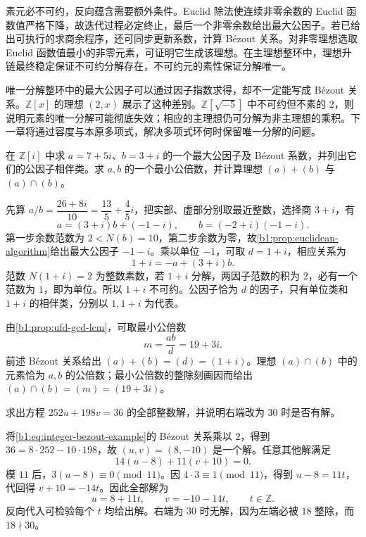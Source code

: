




\begin{chaptersummary}
	素元必不可约，反向蕴含需要额外条件。Euclid 除法使连续非零余数的 Euclid 函数值严格下降，故迭代过程必定终止，最后一个非零余数给出最大公因子。若已给出可执行的求商余程序，还可同步更新系数，计算 Bézout 关系。对非零理想选取 Euclid 函数值最小的非零元素，可证明它生成该理想。在主理想整环中，理想升链最终稳定保证不可约分解存在，不可约元的素性保证分解唯一。

	\ProseParagraphBreak
	唯一分解整环中的最大公因子可以通过因子指数求得，却不一定能写成 Bézout 关系。\(\mathbb Z[x]\) 的理想 \((2,x)\) 展示了这种差别。\(\mathbb Z[\sqrt{-5}]\) 中不可约但不素的 \(2\)，则说明元素的唯一分解可能彻底失效；相应的主理想仍可分解为非主理想的乘积。下一章将通过容度与本原多项式，解决多项式环何时保留唯一分解的问题。
\end{chaptersummary}

\BookExercises

\begin{exercise}\label{b1:ex:11-gaussian-gcd}
	在 \(\mathbb Z[i]\) 中求 \(a=7+5i\)、\(b=3+i\) 的一个最大公因子及 Bézout 系数，并列出它们的公因子相伴类。求 \(a,b\) 的一个最小公倍数，并计算理想 \((a)+(b)\) 与 \((a)\cap(b)\)。
\end{exercise}
\begin{solution}
	先算 \(a/b=\dfrac{26+8i}{10}=\dfrac{13}{5}+\dfrac45i\)，把实部、虚部分别取最近整数，选择商 \(3+i\)，有
	\[
		a=(3+i)b+(-1-i),\qquad b=(-2+i)(-1-i).
	\]
	第一步余数范数为 \(2<N(b)=10\)，第二步余数为零，故\cref{b1:prop:euclidean-algorithm}给出最大公因子 \(-1-i\)。乘以单位 \(-1\)，可取 \(d=1+i\)，相应关系为
	\[
		1+i=-a+(3+i)b.
	\]
	范数 \(N(1+i)=2\) 为整数素数，若 \(1+i\) 分解，两因子范数的积为 \(2\)，必有一个范数为 \(1\)，即为单位。所以 \(1+i\) 不可约。公因子恰为 \(d\) 的因子，只有单位类和 \(1+i\) 的相伴类，分别以 \(1,1+i\) 为代表。

	由\cref{b1:prop:ufd-gcd-lcm}，可取最小公倍数
	\[
		m=\frac{ab}{d}=19+3i.
	\]
	前述 Bézout 关系给出 \((a)+(b)=(d)=(1+i)\)。理想 \((a)\cap(b)\) 中的元素恰为 \(a,b\) 的公倍数；最小公倍数的整除刻画因而给出 \((a)\cap(b)=(m)=(19+3i)\)。
\end{solution}

\begin{exercise}\label{b1:ex:11-diophantine}
	求出方程 \(252u+198v=36\) 的全部整数解，并说明右端改为 \(30\) 时是否有解。
\end{exercise}
\begin{solution}
	将\eqref{b1:eq:integer-bezout-example}的 Bézout 关系乘以 \(2\)，得到 \(36=8\cdot252-10\cdot198\)，故 \((u,v)=(8,-10)\) 是一个解。任意其他解满足
	\[
		14(u-8)+11(v+10)=0.
	\]
	模 \(11\) 后，\(3(u-8)\equiv0\pmod{11}\)。因 \(4\cdot3\equiv1\pmod{11}\)，得到 \(u-8=11t\)，代回得 \(v+10=-14t\)。因此全部解为
	\[
		u=8+11t,\qquad v=-10-14t,\qquad t\in\mathbb Z.
	\]
	反向代入可检验每个 \(t\) 均给出解。右端为 \(30\) 时无解，因为左端必被 \(18\) 整除，而 \(18\nmid30\)。
\end{solution}

